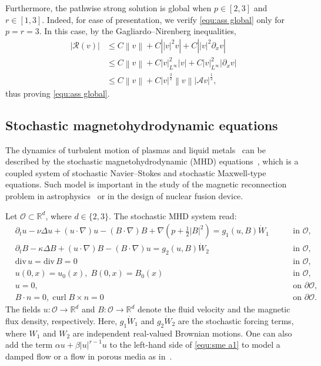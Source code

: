 \documentclass[11pt, reqno]{amsart}
\theoremstyle{definition}
\numberwithin{equation}{section}
\newcommand{\bb}{\mathbb}
\newcommand{\divg}{\mathrm{div}\,}
\newcommand{\norm}[1]{\left\|{#1}\right\|}
\newcommand{\abs}[1]{\left|{#1}\right|}
\begin{document}
Furthermore, the pathwise strong solution is global when $p\in [2,3]$ and $r\in [1,3]$. Indeed, for ease of presentation, we verify \eqref{equ:ass global} only for $p=r=3$. In this case, by the Gagliardo--Nirenberg inequalities,
\begin{align*}
	\abs{\mathcal{R}(v)}
	&\leq
	C\norm{v}+ C\abs{|v|^2 v}+ C\abs{|v|^2 \partial_x v}
	\\
	&\leq
	C\norm{v}+ C\abs{v}_{L^\infty}^2 \abs{v} + C \abs{v}_{L^\infty}^2 \abs{\partial_x v}
	\\
	&\leq
	C\norm{v} + C\abs{v}^{\frac32} \norm{v} \abs{\mathcal{A} v}^{\frac12},
\end{align*}
thus proving \eqref{equ:ass global}.




\subsection{Stochastic magnetohydrodynamic equations}\label{sec:mhd}

The dynamics of turbulent motion of plasmas and liquid metals~\cite{Bis03} can be described by the stochastic magnetohydrodynamic (MHD) equations~\cite{Mot22, SerTem83}, which is a coupled system of stochastic Navier--Stokes and stochastic Maxwell-type equations. Such model is important in the study of the magnetic reconnection problem in astrophysics~\cite{PriFor00} or in the design of nuclear fusion device. 

Let $\mathscr{O}\subset\bb{R}^d$, where $d\in \{2,3\}$. The stochastic MHD system read:
\begin{subequations}\label{equ:sme}
	\begin{alignat}{2}
		&\partial_t u - \nu \Delta u + (u\cdot\nabla)u - (B\cdot\nabla) B + \nabla \left(p+\frac12 \abs{B}^2\right) = g_1(u,B)\dot{W}_1
		\; && \quad\text{in $\mathscr{O}$,}
		\label{equ:sme a1}
		\\[1ex]
        \label{equ:sme a2}
        &\partial_t B - \kappa \Delta B + (u\cdot\nabla)B - (B\cdot\nabla)u = g_2(u,B) \dot{W}_2
        \; && \quad\text{in $\mathscr{O}$,}
        \\[1ex]
		&\divg u = \divg B= 0
		\; && \quad\text{in $\mathscr{O}$,}
		\label{equ:sme b}
		\\[1ex]
		&u(0,x)= u_0(x), \; B(0,x)= B_0(x)
		\; && \quad\text{in $\mathscr{O}$,}
		\label{equ:sme c}
		\\[1ex]
		&u = 0,
		\; && \quad\text{on $\partial\mathscr{O}$,}
		\label{equ:sme d}
        \\[1ex]
        \label{equ:sme e}
        &B\cdot n=0, \; \mathrm{curl}\; B\times n=0
        \; && \quad \text{on $\partial\mathscr{O}$.}
	\end{alignat}
\end{subequations}
The fields $u:\mathscr{O}\to \bb{R}^d$ and $B:\mathscr{O}\to \bb{R}^d$ denote the fluid velocity and the magnetic flux density, respectively. Here, $g_1\dot{W}_1$ and $g_2\dot{W}_2$ are the stochastic forcing terms, where $W_1$ and $W_2$ are independent real-valued Brownian motions. One can also add the term $\alpha u+ \beta \abs{u}^{r-1} u$ to the left-hand side of \eqref{equ:sme a1} to model a damped flow or a flow in porous media as in~\cite{AngCamCau23, TitTra19}.
\end{document}
